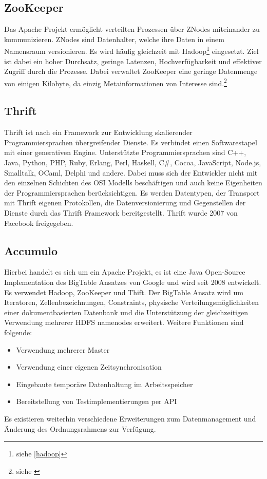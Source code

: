 \subsection{ZooKeeper}
\label{zookeeper}
Das Apache Projekt ermöglicht verteilten Prozessen über ZNodes miteinander zu kommunizieren.
ZNodes sind Datenhalter, welche ihre Daten in einem Namensraum versionieren.
Es wird häufig gleichzeit mit Hadoop\footnote{siehe \ref{hadoop}} eingesetzt.
Ziel ist dabei ein hoher Durchsatz, geringe Latenzen, Hochverfügbarkeit und effektiver Zugriff durch die Prozesse.
Dabei verwaltet ZooKeeper eine geringe Datenmenge von einigen Kilobyte, da einzig Metainformationen von Interesse sind.\footnote{siehe \cite{website:zookeeper}} 



\subsection{Thrift}
\label{thrift}
Thrift ist nach \cite{website:thrift} ein Framework zur Entwicklung skalierender Programmiersprachen übergreifender Dienste.
Es verbindet einen Softwarestapel mit einer generativen Engine.
Unterstützte Programmiersprachen sind C++, Java, Python, PHP, Ruby, Erlang, Perl, Haskell, C\#, Cocoa, JavaScript, Node.js, Smalltalk, OCaml, Delphi und andere.
Dabei muss sich der Entwickler nicht mit den einzelnen Schichten des OSI Modells beschäftigen und auch keine Eigenheiten der Programmiersprachen berücksichtigen.
Es werden Datentypen, der Transport mit Thrift eigenen Protokollen, die Datenversionierung und Gegenstellen der Dienste durch das Thrift Framework bereitgestellt.
Thrift wurde 2007 von Facebook freigegeben. \cite[S.1]{paper:thrift}


\subsection{Accumulo}
\label{accumulo}
Hierbei handelt es sich um ein Apache Projekt, es ist eine Java Open-Source Implementation des BigTable Ansatzes von Google und wird seit 2008 entwickelt.
Es verwendet Hadoop, ZooKeeper und Thift.
Der BigTable Ansatz wird um Iteratoren, Zellenbezeichnungen, Constraints, physische Verteilungsmöglichkeiten einer dokumentbasierten Datenbank und die Unterstützung der gleichzeitigen Verwendung mehrerer HDFS namenodes erweitert.
Weitere Funktionen sind folgende:
\begin{itemize}
\item Verwendung mehrerer Master
\item Verwendung einer eigenen Zeitsynchronisation
\item Eingebaute temporäre Datenhaltung im Arbeitsspeicher
\item Bereitstellung von Testimplementierungen per API
\end {itemize}
Es existieren weiterhin verschiedene Erweiterungen zum Datenmanagement und Änderung des Ordnungsrahmens zur Verfügung. \cite{website:accumulo_features}

